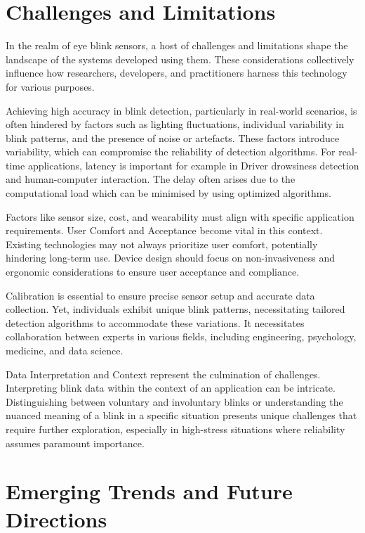\documentclass[conference]{IEEEtran}
\begin{document}
\section{Challenges and Limitations}

In the realm of eye blink sensors, a host of challenges and limitations shape the landscape of the systems developed using them. These considerations collectively influence how researchers, developers, and practitioners harness this technology for various purposes.

 Achieving high accuracy in blink detection, particularly in real-world scenarios, is often hindered by factors such as lighting fluctuations, individual variability in blink patterns, and the presence of noise or artefacts. These factors introduce variability, which can compromise the reliability of detection algorithms. For real-time applications, latency is important for example in  Driver drowsiness detection and human-computer interaction. The delay often arises due to the computational load which can be minimised by using optimized algorithms.

 Factors like sensor size, cost, and wearability must align with specific application requirements. User Comfort and Acceptance become vital in this context. Existing technologies may not always prioritize user comfort, potentially hindering long-term use. Device design should focus on non-invasiveness and ergonomic considerations to ensure user acceptance and compliance.

Calibration is essential to ensure precise sensor setup and accurate data collection. Yet, individuals exhibit unique blink patterns, necessitating tailored detection algorithms to accommodate these variations.  It necessitates collaboration between experts in various fields, including engineering, psychology, medicine, and data science. 

Data Interpretation and Context represent the culmination of challenges. Interpreting blink data within the context of an application can be intricate. Distinguishing between voluntary and involuntary blinks or understanding the nuanced meaning of a blink in a specific situation presents unique challenges that require further exploration, especially in high-stress situations where reliability assumes paramount importance.

\section{Emerging Trends and Future Directions}
\end{document}
